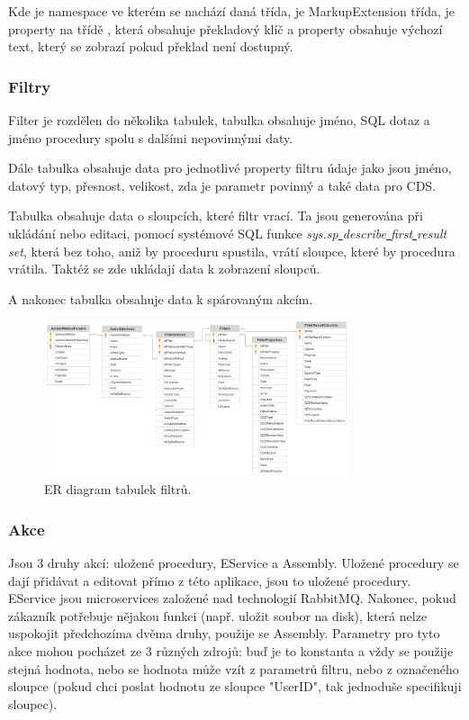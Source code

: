 \documentclass[czech,bachelorpractice,dept460,male,csharp]{diploma}
\newcommand{\un}{\underline{ }}
\begin{document}
			 Kde  je namespace ve kterém se nachází daná třída,  je MarkupExtension třída,  je property na třídě , která obsahuje překladový klíč a property  obsahuje výchozí text, který se zobrazí pokud překlad není dostupný.
		\subsubsection{Filtry}
		\label{txt:filters}
			Filter je rozdělen do několika tabulek, tabulka  obsahuje jméno, SQL dotaz a jméno procedury spolu s dalšími nepovinnými daty. 
			
			Dále tabulka  obsahuje data pro jednotlivé property filtru údaje jako jsou jméno, datový typ, přesnost, velikost, zda je parametr povinný a také data pro CDS. 
			
			Tabulka  obsahuje data o sloupcích, které filtr vrací. Ta jsou generována při ukládání nebo editaci, pomocí systémové SQL funkce \textit{sys.sp{\un}describe{\un}first{\un}result{\un}set}, která bez toho, aniž by proceduru spustila, vrátí sloupce, které by procedura vrátila. Taktéž se zde ukládají data k zobrazení sloupců. 
			
			A nakonec tabulka  obsahuje data k spárovaným akcím.
			\begin{figure}[h!]
				\centering
				\includegraphics[width=0.8\textwidth]{Figures/ERdiagram.png}
				\caption{ER diagram tabulek filtrů.}
    			\label{fig:ERdiagram}
			\end{figure}
		\subsubsection{Akce}
		\label{txt:action}
			Jsou 3 druhy akcí: uložené procedury, EService a Assembly. Uložené procedury se dají přidávat a editovat přímo z této aplikace, jsou to uložené procedury. EService jsou microservices založené nad technologií RabbitMQ\cite{RabbitMQ}. Nakonec, pokud zákazník potřebuje nějakou funkci (např. uložit soubor na disk), která nelze uspokojit předchozíma dvěma druhy, použije se Assembly. Parametry pro tyto akce mohou pocházet ze 3 různých zdrojů: buď je to konstanta a vždy se použije stejná hodnota, nebo se hodnota může vzít z parametrů filtru, nebo z označeného sloupce (pokud chci poslat hodnotu ze sloupce "UserID", tak jednoduše specifikuji sloupec). 
\end{document}
